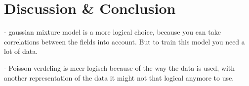 \documentclass[11pt,a4paper]{article}
\begin{document}
\pagebreak
 
\section{Discussion \& Conclusion}
\label{sec:DisCon}
- gaussian mixture model is a more logical choice, because you can take correlations between the fields into account. But to train this model you need a lot of data.

- Poisson verdeling is meer logisch because of the way the data is used, with another representation of the data it might not that logical anymore to use.



\appendix

{}

\end{document}
